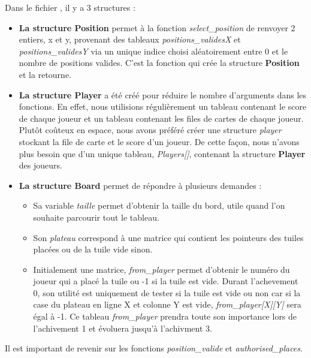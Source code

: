 \documentclass[a4paper]{article}
\begin{document}
Dans le fichier ,  il y a 3 structures :
\begin{itemize}
\item \textbf{La structure Position} permet à la fonction \emph{select\_position} de renvoyer 2 entiers, x et y, provenant des tableaux \emph{positions\_validesX} et \emph{positions\_validesY} via un unique indice choisi aléatoirement entre 0 et le nombre de positions valides. C'est la fonction qui crée la structure \textbf{Position} et la retourne. \\

\item \textbf{La structure Player} a été créé pour réduire le nombre d'arguments dans les fonctions.
  En effet, nous utilisions régulièrement un tableau contenant le score de chaque joueur et un tableau contenant les files de cartes de chaque joueur. Plutôt coûteux en espace, nous avons préféré créer une structure \emph{player} stockant la file de carte et le score d'un joueur. De cette façon, nous n'avons plus besoin que d'un unique tableau, \emph{Players[]}, contenant la structure \textbf{Player} des joueurs. \\

\item \textbf{La structure Board} permet de répondre à plusieurs demandes :
  \begin{itemize}
  \item Sa variable \emph{taille} permet d'obtenir la taille du bord, utile quand l'on souhaite parcourir tout le tableau. 
  \item Son \emph{plateau} correspond à une matrice qui contient les pointeurs des tuiles placées ou de la tuile vide sinon.
  \item Initialement une matrice, \emph{from\_player} permet d'obtenir le numéro du joueur qui a placé la tuile ou -1 si la tuile est vide. Durant l'achevement 0, son utilité est uniquement de tester si la tuile est vide ou non car si la case du plateau en ligne X et colonne Y est vide, \emph{from\_player[X][Y]} sera égal à -1. Ce tableau \emph{from\_player} prendra toute son importance lors de l'achivement 1 et évoluera jusqu'à l'achivment 3.  \\
    \end{itemize}
\end{itemize}

Il est important de revenir sur les fonctions \emph{position\_valide} et \emph{authorised\_places}. \\
\end{document}
